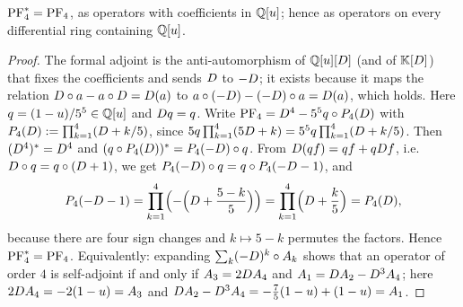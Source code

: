 \begin{lem}
\label{lem:gau-adj}
$\mathrm{PF}_{4}^*=\mathrm{PF}_{4}$, as operators with coefficients in $\mathbb{Q}[u]$; hence as operators on every differential ring containing $\mathbb{Q}[u]$.
\end{lem}

\begin{proof}
The formal adjoint is the anti-automorphism of $\mathbb{Q}[u][D]$ (and of $\mathbb{K}[D]$) that fixes the coefficients and sends $D$ to $-D$; it exists because it maps the relation $D\circ a-a\circ D=D(a)$ to $a\circ(-D)-(-D)\circ a=D(a)$, which holds. Here $q=(1-u)/5^5\in\mathbb{Q}[u]$ and $D q=q$. Write $\mathrm{PF}_{4}=D^4-5^5q\circ P_4(D)$ with $P_4(D):=\prod_{k=1}^4(D+k/5)$, since $5q\prod_{k=1}^4(5D+k)=5^5q\prod_{k=1}^4(D+k/5)$. Then $(D^4)^*=D^4$ and $(q\circ P_4(D))^*=P_4(-D)\circ q$. From $D(qf)=qf+qD f$, i.e.\ $D\circ q=q\circ(D+1)$, we get $P_4(-D)\circ q=q\circ P_4(-D-1)$, and
\[
P_4(-D-1)=\prod_{k=1}^4\Bigl(-\Bigl(D+\frac{5-k}5\Bigr)\Bigr)=\prod_{k=1}^4\Bigl(D+\frac k5\Bigr)=P_4(D),
\]
because there are four sign changes and $k\mapsto5-k$ permutes the factors. Hence $\mathrm{PF}_{4}^*=\mathrm{PF}_{4}$. Equivalently: expanding $\sum_k(-D)^k\circ A_k$ shows that an operator of order $4$ is self-adjoint if and only if $A_3=2D A_4$ and $A_1=D A_2-D^3A_4$; here $2D A_4=-2(1-u)=A_3$ and $D A_2-D^3A_4=-\frac75(1-u)+(1-u)=A_1$.
\end{proof}

